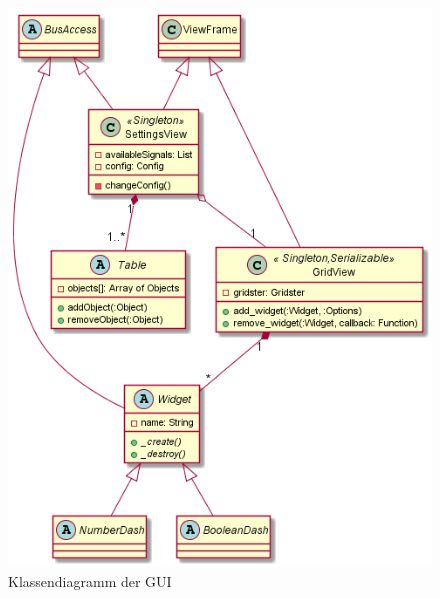 \documentclass[entwurf.tex]{subfiles}
\begin{document}
		\begin{figure}[H]
  			\begin{center}
 				\includegraphics[width=\textwidth]{diagrams/UI.png}
  				\caption{Klassendiagramm der GUI}
  			\end{center}
  		\end{figure}
  		
  	\newpage
\end{document}
